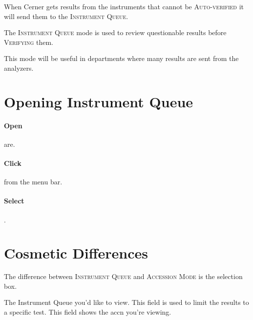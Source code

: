 When Cerner gets results from the instruments that cannot be \textsc{Auto-verified} it will send them to the \textsc{Instrument Queue}.

The \textsc{Instrument Queue} mode is used to review questionable results before \textsc{Verifying} them.

This mode will be useful in departments where many results are sent from the analyzers.\\


\section{Opening Instrument Queue}

\paragraph{Open} \gls{are}.

\paragraph{Click}  from the menu bar.

\paragraph{Select} .

\section{Cosmetic Differences}

The difference between \textsc{Instrument Queue} and \textsc{Accession Mode} is the selection box.\\


\begin{description}
     The Instrument Queue you'd like to view.
     This field is used to limit the results to a specific test.
     This field shows the \gls{accn} you're viewing.
\end{description}

